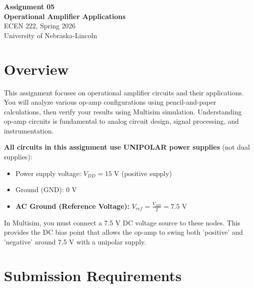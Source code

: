 \documentclass[11pt]{article}
\begin{document}
\begin{center}
    {\LARGE \textbf{Assignment 05}}\\
    {\LARGE \textbf{Operational Amplifier Applications}}\\
    \vspace{0.3cm}
    {\large ECEN 222, Spring 2026}\\
    \vspace{0.2cm}
    {\large University of Nebraska-Lincoln}\\
    \vspace{0.5cm}
\end{center}

\section*{Overview}

This assignment focuses on operational amplifier circuits and their applications. You will analyze various op-amp configurations using pencil-and-paper calculations, then verify your results using Multisim simulation. Understanding op-amp circuits is fundamental to analog circuit design, signal processing, and instrumentation.

\vspace{0.3cm}

\begin{tcolorbox}[colback=blue!5!white,colframe=blue!75!black,title=\textbf{Unipolar Power Supply Configuration}]
\textbf{All circuits in this assignment use UNIPOLAR power supplies} (not dual supplies):
\begin{itemize}
    \item Power supply voltage: $V_{DD} = 15$ V (positive supply)
    \item Ground (GND): 0 V
    \item \textbf{AC Ground (Reference Voltage):} $V_{ref} = \frac{V_{DD}}{2} = 7.5$ V
\end{itemize}



In Multisim, you must connect a 7.5 V DC voltage source to these nodes. This provides the DC bias point that allows the op-amp to swing both 'positive' and 'negative' around 7.5 V with a unipolar supply.
\end{tcolorbox}

\vspace{0.3cm}

\section*{Submission Requirements}
\end{document}

